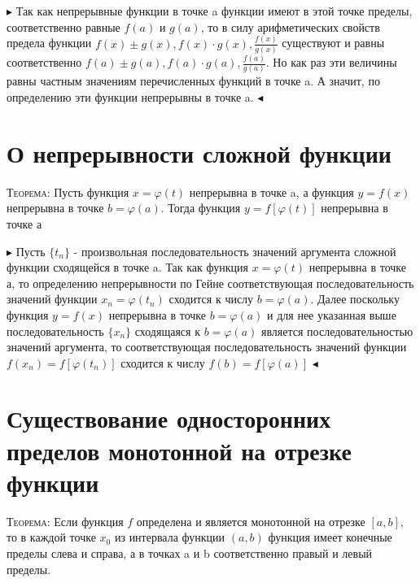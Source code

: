 \documentclass[14pt]{article}
\begin{document}
        $\blacktriangleright$ 
            Так как непрерывные функции в точке a функции имеют в этой точке пределы, соответственно равные $f(a)$ и $g(a)$, то в силу арифметических свойств предела функции $f(x)\pm g(x), f(x) \cdot g(x), \frac{f(x)}{g(x)}$ существуют и равны соответственно $f(a)\pm g(a), f(a) \cdot g(a), \frac{f(a)}{g(a)}$. Но как раз эти величины равны частным значениям перечисленных функций в точке a. А значит, по определению эти функции непрерывны в точке a.
        $\blacktriangleleft$\\
    \section{О непрерывности сложной функции} 
        \textsc{Теорема:} Пусть функция $x=\varphi (t)$ непрерывна в точке a, а функция $y=f(x)$ непрерывна в точке $b=\varphi(a) $. Тогда функция $y=f[\varphi(t)]$ непрерывна в точке а
        
        $\blacktriangleright$ 
            Пусть $\{t_n\}$ - произвольная последовательность значений аргумента сложной функции сходящейся в точке a. Так как функция $x=\varphi(t)$ непрерывна в точке а, то определению непрерывности по Гейне соответствующая последовательность значений функции $x_n = \varphi(t_n)$ сходится к числу $b = \varphi(a)$. Далее поскольку функция $y=f(x)$ непрерывна в точке $b=\varphi(a)$ и для нее указанная выше последовательность $\{x_n\}$ сходящаяся к $b=\varphi(a)$ является последовательностью значений аргумента, то соответствующая последовательность значений функции $f(x_n) = f[\varphi(t_n)] $ сходится к числу $f(b)=f[\varphi(a)]$
        $\blacktriangleleft$\\
    \section{Существование односторонних пределов монотонной на отрезке функции}
        \textsc{Теорема:} Если функция $f$ определена и является монотонной на отрезке $[a,b]$, то в каждой точке $x_0$ из интервала функции $(a,b)$ функция имеет конечные пределы слева и справа, а в точках a и b соответственно правый и левый пределы.
\end{document}
